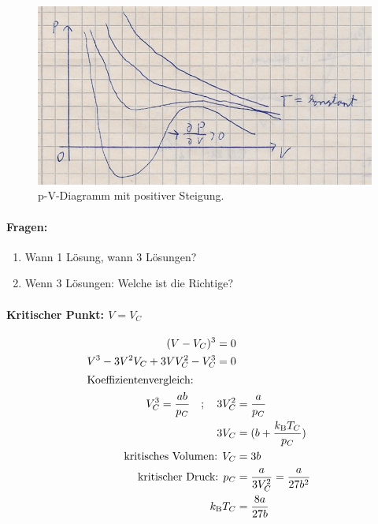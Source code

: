 \begin{figure}[H]
  \centering
  \includegraphics[width = \textwidth]{Zeichnungen/15.pdf}
  \caption{p-V-Diagramm mit positiver Steigung.}
\end{figure}

\paragraph{Fragen:}
\begin{enumerate}
    \item  Wann 1 Lösung, wann 3 Lösungen?
    \item  Wenn 3 Lösungen: Welche ist die Richtige?    
\end{enumerate}

\paragraph{Kritischer Punkt: $V = V_C$} 
\begin{align}
    (V-V_C)^3 = 0 \\
     V^3 - 3 V^2 V_C + 3 V V_C^2 - V_C^3 = 0\\
\intertext{Koeffizientenvergleich:}
    V_C^3=\frac{ab}{p_C}  \quad ;\quad 3V_C^2&=\frac{a}{p_C}\\
    3 V_C &= (b+\frac{k_\text{B} T_C}{p_C}) \\
    \text{kritisches Volumen: } V_C &= 3 b\\
    \text{kritischer Druck: } p_C &= \frac{a}{3V_C^2} = \frac{a}{27b^2} \\
    k_\text{B} T_C &= \frac{8 a}{27 b}
\end{align}

